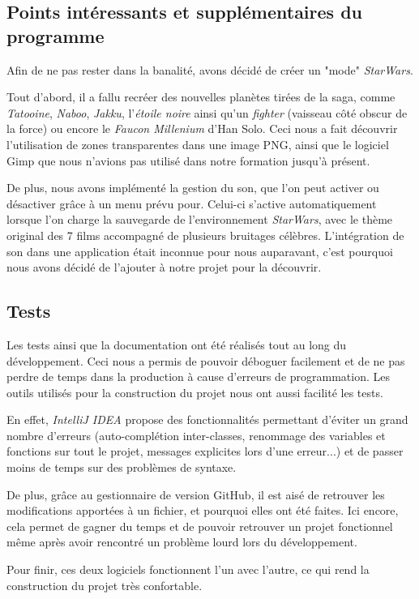 \documentclass[a4paper,10pt]{article}
\begin{document}
\subsection{Points intéressants et supplémentaires du programme}
Afin de ne pas rester dans la banalité, avons décidé de créer un "mode" \textit{StarWars}. 

Tout d'abord, il a fallu recréer des nouvelles planètes tirées de la saga, comme \textit{Tatooine}, \textit{Naboo}, \textit{Jakku}, l'\textit{étoile noire} ainsi qu'un \textit{fighter} (vaisseau côté obscur de la force) ou encore le \textit{Faucon Millenium} d'Han Solo. Ceci nous a fait découvrir l'utilisation de zones transparentes dans une image PNG, ainsi que le logiciel Gimp que nous n'avions pas utilisé dans notre formation jusqu'à présent.

De plus, nous avons implémenté la gestion du son, que l'on peut activer ou désactiver grâce à un menu prévu pour. Celui-ci s'active automatiquement lorsque l'on charge la sauvegarde de l'environnement \textit{StarWars}, avec le thème original des 7 films accompagné de plusieurs bruitages célèbres. L'intégration de son dans une application était inconnue pour nous auparavant, c'est pourquoi nous avons décidé de l'ajouter à notre projet pour la découvrir.

\subsection{Tests}
Les tests ainsi que la documentation ont été réalisés tout au long du développement. Ceci nous a permis de pouvoir déboguer facilement et de ne pas perdre de temps dans la production à cause d'erreurs de programmation. Les outils utilisés pour la construction du projet nous ont aussi facilité les tests. 

En effet, \textit{IntelliJ IDEA} propose des fonctionnalités permettant d'éviter un grand nombre d'erreurs (auto-complétion inter-classes, renommage des variables et fonctions sur tout le projet, messages explicites lors d'une erreur...) et de passer moins de temps sur des problèmes de syntaxe. 

De plus, grâce au gestionnaire de version GitHub, il est aisé de retrouver les modifications apportées à un fichier, et pourquoi elles ont été faites. Ici encore, cela permet de gagner du temps et de pouvoir retrouver un projet fonctionnel même après avoir rencontré un problème lourd lors du développement. 

Pour finir, ces deux logiciels fonctionnent l'un avec l'autre, ce qui rend la construction du projet très confortable.
\\
\end{document}
